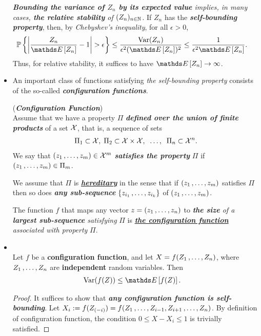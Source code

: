 \documentclass[11pt]{article}
\begin{document}
\begin{itemize}
\begin{remark}
\emph{\textbf{Bounding the variance of $Z_n$ by its expected value} implies, in many cases, \textbf{the relative stability} of $(Z_n)_{n\in {\mathbb N}}$}. If $Z_n$ has the
\emph{\textbf{self-bounding property}}, then, by \emph{Chebyshev's inequality}, for all $\epsilon > 0$,
\begin{align*}
\bP\set{\abs{\frac{Z_n}{\E{}{Z_n}} - 1} > \epsilon} &\le \frac{\text{Var}(Z_n)}{\epsilon^2 (\E{}{Z_n})^2} \le \frac{1}{\epsilon^2 \E{}{Z_n}}.
\end{align*}
Thus, for relative stability, it suffices to have $\E{}{Z_n} \to \infty$.
\end{remark}

\item An important class of functions satisfying \emph{the self-bounding property} consists of the so-called \emph{\textbf{configuration functions}}.
\begin{definition} (\emph{\textbf{Configuration Function}})\\
Assume that we have a property $\Pi$ \emph{\textbf{defined over the union of finite products}} of a set ${\mathcal X}$, that is, a sequence of sets 
\begin{align*}
\Pi_1 \subset {\mathcal X},\;  \Pi_2 \subset {\mathcal X} \times {\mathcal X}, \;\;\ldots,\;\; \Pi_n \subset {\mathcal X}^n.
\end{align*} We say that $(z_1 \,{,}\ldots{,}\, z_m) \in {\mathcal X}^m$ \emph{\textbf{satisfies the property}} $\Pi$ if $(z_1 \,{,}\ldots{,}\, z_m) \in \Pi_m$. 

We assume that $\Pi$ is \underline{\emph{\textbf{hereditary}}} in the sense that if $(z_1 \,{,}\ldots{,}\, z_m)$ satisfies $\Pi$ then so does \emph{\textbf{any sub-sequence}} $\left\{z_{i_1} \,{,}\ldots{,}\, z_{i_k}\right\}$ of $(z_1 \,{,}\ldots{,}\, z_m)$. 

The function $f$ that maps any vector $z = (z_1 \,{,}\ldots{,}\, z_n)$  to \emph{\textbf{the size} of a \textbf{largest sub-sequence} satisfying} $\Pi$ is \underline{\emph{\textbf{the configuration function}}} \emph{associated with property} $\Pi$.
\end{definition}

\item \begin{corollary} \citep{boucheron2013concentration}\\
Let $f$ be a \textbf{configuration function}, and let $X = f(Z_1 \,{,}\ldots{,}\, Z_n)$, where $Z_1 \,{,}\ldots{,}\, Z_n$ are \textbf{independent} random variables. Then
\begin{align*}
\text{Var}(f(Z)) &\le \E{}{f(Z)}.
\end{align*}
\end{corollary}
\begin{proof}
It suffices to show that \emph{\textbf{any configuration function is self-bounding}}.
Let $X_i := f(Z_{(-i)}) =  f(Z_1 \,{,}\ldots{,}\, Z_{i-1}, Z_{i+1} \,{,}\ldots{,}\, Z_n)$. By definition of configuration function, the condition $0 \le X - X_i \le 1$ is trivially satisfied. 


\end{proof}
\end{itemize}
\end{document}
